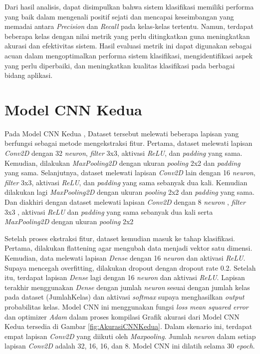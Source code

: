 Dari hasil analisis, dapat disimpulkan bahwa sistem klasifikasi memiliki performa yang baik dalam mengenali positif sejati dan mencapai keseimbangan yang memadai antara \textit{Precision} dan \textit{Recall} pada kelas-kelas tertentu. Namun, terdapat beberapa kelas dengan nilai metrik yang perlu ditingkatkan guna meningkatkan akurasi dan efektivitas sistem. Hasil evaluasi metrik ini dapat digunakan sebagai acuan dalam mengoptimalkan performa sistem klasifikasi, mengidentifikasi aspek yang perlu diperbaiki, dan meningkatkan kualitas klasifikasi pada berbagai bidang aplikasi.

\section{Model CNN Kedua}
Pada Model CNN Kedua , Dataset tersebut melewati beberapa lapisan yang berfungsi sebagai metode mengekstraksi fitur. Pertama, dataset melewati lapisan \textit{Conv2D} dengan 32 \textit{neuron}, \textit{filter} 3x3, aktivasi \textit{ReLU}, dan \textit{padding} yang sama. Kemudian, dilakukan \textit{MaxPooling2D} dengan ukuran \textit{pooling} 2x2 dan \textit{padding} yang sama. Selanjutnya, dataset melewati lapisan \textit{Conv2D} lain dengan 16 \textit{neuron}, \textit{filter} 3x3, aktivasi \textit{ReLU}, dan \textit{padding} yang sama sebanyak dua kali. Kemudian dilakukan lagi \textit{MaxPooling2D} dengan ukuran \textit{pooling} 2x2 dan \textit{padding} yang sama. Dan diakhiri dengan dataset melewati lapisan \textit{Conv2D} dengan 8 \textit{neuron} , \textit{filter} 3x3 , aktivasi \textit{ReLU} dan \textit{padding} yang sama sebanyak dua kali serta \textit{MaxPooling2D} dengan ukuran \textit{pooling} 2x2 

Setelah proses ekstraksi fitur, dataset kemudian masuk ke tahap klasifikasi. Pertama, dilakukan flattening agar mengubah data menjadi vektor satu dimensi. Kemudian, data melewati lapisan \textit{Dense} dengan 16 \textit{neuron} dan aktivasi \textit{ReLU}. Supaya mencegah overfitting, dilakukan dropout dengan dropout rate 0.2. Setelah itu, terdapat lapisan \textit{Dense} lagi dengan 16 \textit{neuron} dan aktivasi \textit{ReLU}. Lapisan terakhir menggunakan \textit{Dense} dengan jumlah \textit{neuron} sesuai dengan jumlah kelas pada dataset (JumlahKelas) dan aktivasi \textit{softmax} supaya menghasilkan \textit{output} probabilitas kelas. Model CNN ini menggunakan fungsi \textit{loss} \textit{mean squared error} dan optimizer \textit{Adam} dalam proses kompilasi Grafik akurasi dari Model CNN Kedua tersedia di Gambar \ref{fig:AkurasiCNNKedua}. Dalam skenario ini, terdapat empat lapisan \textit{Conv2D} yang diikuti oleh \textit{Maxpooling}. Jumlah \textit{neuron} dalam setiap lapisan \textit{Conv2D} adalah 32, 16, 16, dan 8. Model CNN ini dilatih selama 30\textit{ epoch}.

